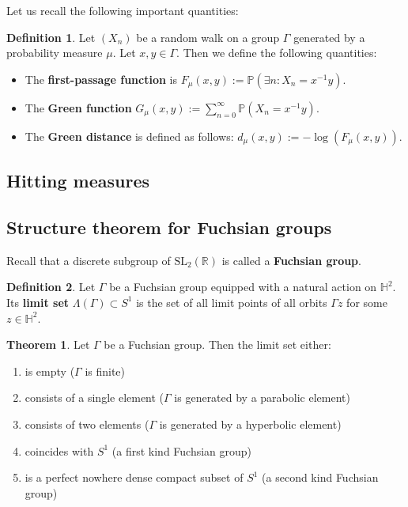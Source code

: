 \documentclass[11pt]{amsart}
\theoremstyle{definition}
\newtheorem{definition}{Definition}[section]
\newtheorem{theorem}{Theorem}[section]
\begin{document}
			Let us recall the following important quantities:
			\begin{definition}
				Let $(X_n)$ be a random walk on a group $\Gamma$ generated by a probability measure $\mu$. Let $x, y \in \Gamma$. Then we define the following quantities:
				\begin{itemize}
					\item The \textbf{first-passage function} is $F_\mu(x, y) := \mathbb{P}(\exists n : X_n = x^{-1} y)$.
					\item The \textbf{Green function} $G_\mu(x, y) := \sum_{n=0}^{\infty} \mathbb{P}(X_n = x^{-1} y)$.
					\item The \textbf{Green distance} is defined as follows: $d_\mu(x, y) := - \log(F_\mu(x, y))$.
				\end{itemize} 
			\end{definition}
			
		\subsection{Hitting measures}
		
		\subsection{Structure theorem for Fuchsian groups}
		Recall that a discrete subgroup of $\text{SL}_2(\mathbb{R})$ is called a \textbf{Fuchsian group}.
		
		\begin{definition}
			Let $\Gamma$ be a Fuchsian group equipped with a natural action on $\mathbb{H}^2$. Its \textbf{limit set} $\Lambda(\Gamma) \subset S^1$ is the set of all limit points of all orbits $\Gamma z$ for some $z \in \mathbb{H}^2$. 
		\end{definition}
		\begin{theorem}
			\label{classification of Fuchsian}
			Let $\Gamma$ be a Fuchsian group. Then the limit set either:
			\begin{enumerate}
				\item is empty ($\Gamma$ is finite)
				\item consists of a single element ($\Gamma$ is generated by a parabolic element)
				\item consists of two elements ($\Gamma$ is generated by a hyperbolic element)
				\item coincides with $S^1$ (a first kind Fuchsian group)
				\item is a perfect nowhere dense compact subset of $S^1$ (a second kind Fuchsian group) 
			\end{enumerate}
		\end{theorem}
		
\end{document}

